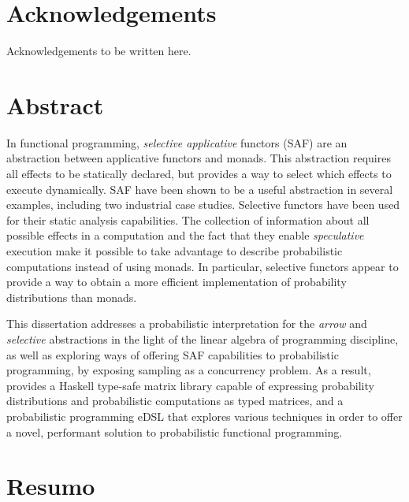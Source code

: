 \documentclass[
  oneside,
  11pt, a4paper,
  footinclude=true,
  headinclude=true,
  cleardoublepage=empty
]{scrbook}
\author{Armando João Isaías Ferreira dos Santos}
\date{\myear} %
\theoremstyle{definition}
\theoremstyle{definition}
\begin{document}
	\umfrontcover	
	\umtitlepage
	
	\chapter*{Acknowledgements}
	Acknowledgements to be written here. %

	\chapter*{Abstract}

    In functional programming, \emph{selective applicative} functors (SAF) are an abstraction between applicative functors and monads. This abstraction requires all effects to be statically declared, but provides a way to select which effects to execute dynamically. SAF have been shown to be a useful abstraction in several examples, including two industrial case studies. Selective functors have been used for their static analysis capabilities. The collection of information about all possible effects in a computation and the fact that they enable \emph{speculative} execution make it possible to take advantage to describe probabilistic computations instead of using monads. In particular, selective functors appear to provide a way to obtain a more efficient implementation of probability distributions than monads.
    
    This dissertation addresses a probabilistic interpretation for the \emph{arrow} and \emph{selective} abstractions in the light of the linear algebra of programming discipline, as well as exploring ways of offering SAF capabilities to probabilistic programming, by exposing sampling as a concurrency problem. As a result, provides a Haskell type-safe matrix library capable of expressing probability distributions and probabilistic computations as typed matrices, and a probabilistic programming eDSL that explores various techniques in order to offer a novel, performant solution to probabilistic functional programming.
	
	\vskip0.5cm
	
	\cleardoublepage
	\chapter*{Resumo}
	
\end{document}
